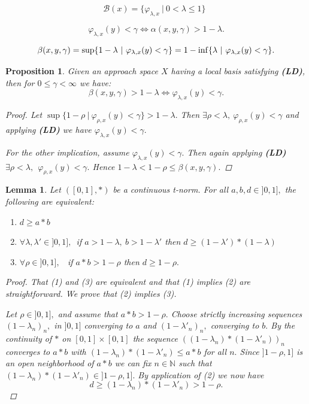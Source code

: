 \documentclass[10pt,a4paper]{amsart}
\newtheorem{proposition}{Proposition}
\newtheorem{lemma}{Lemma}
\newcommand{\N}{\ensuremath{\mathbb{N}}}
\renewcommand{\a}{\ensuremath{\alpha}}
\renewcommand{\b}{\ensuremath{\beta}}
\newcommand{\bbb}{\ensuremath{\mathcal{B}}}
\renewcommand{\inf}{\myinf}
\renewcommand{\l}{\ensuremath{\lambda}}
\DeclareMathOperator*{\myinf}{in\vphantom{p}f}
\begin{document}
\begin{equation}\label{associated}
\bbb(x) = \{ \varphi_{\l,x} \ | \ 0 < \l \leq 1 \} \ \ 
\end{equation}

\begin{equation}\label{equivlocal}
\varphi_{\l,x} (y) < \gamma \Leftrightarrow \a(x,y,\gamma) > 1-\l.
\end{equation}

\begin{equation}\label{beta}
\b(x,y,\gamma) = \sup \{1 - \l \ | \ \varphi_{\l,x} (y) < \gamma\} = 1 - \inf  \{\l \ | \ \varphi_{\l,x} (y) < \gamma\}.
\end{equation}

\begin{proposition}\label{equivbeta}
Given an approach space $X$ having a local basis satisfying {\bf(LD)},
then for $0 \leq \gamma < \infty$ we have:
$$
\b(x,y,\gamma) > 1 - \l   \Leftrightarrow  \varphi_{\l,x} (y) < \gamma.
$$
\begin{proof}
Let  $\sup \{1 - \rho \ | \ \varphi_{\rho,x} (y) < \gamma\}  > 1 - \l.$ Then $\exists \rho < \l, \ \varphi_{\rho,x}(y) < \gamma$ and applying {\bf(LD)} we have 
$\varphi_{\l,x}(y) < \gamma.$

For the other implication,  assume $\varphi_{\l,x}(y) < \gamma.$ Then again applying {\bf(LD)}\\
 $\exists \rho < \l, 
 \  \ \varphi_{\rho,x}(y) < \gamma.$
Hence $1 - \l < 1 - \rho \leq \b(x,y,\gamma).$
\end{proof}
\end{proposition}

\begin{lemma}\label{star}
Let $([0,1], *)$ be a continuous t-norm. For all $a,b,d \in ]0,1],$ the following are equivalent:
\begin{enumerate}
\item $d \geq a * b$
\item $\forall \l,\l' \in ]0,1], $\  if $a > 1-\l, \ b > 1-\l'$ then $d \geq (1-\l') * (1-\l)$
\item $\forall \rho  \in ]0,1],$ \ if $a * b > 1-\rho$ then $d \geq 1-\rho.$
\end{enumerate}
\begin{proof}
That (1) and (3) are equivalent and that (1) implies (2) are straightforward.
We prove that (2) implies (3). 

Let $ \rho  \in ]0,1],$ and assume that $a*b > 1-\rho.$
Choose strictly increasing sequences $(1-\l_n)_n,$ in $]0,1]$ converging to $a$ and $(1-\l'_n)_n,$ converging to $b.$ 
By the continuity of $*$ on $[0,1]\times [0,1]$ the sequence $((1-\l_n) * (1-\l'_n))_n$ converges to $a * b$ with $(1-\l_n) * (1-\l'_n) \leq a*b$ for all $n.$
Since $]1-\rho, 1]$ is an open neighborhood of $a * b$ we can fix $n \in \N$ such that $(1-\l_n) * (1-\l'_n) \in ]1-\rho, 1].$
By application of (2) we now have
$$
d \geq (1-\l_n) * (1-\l'_n) > 1 - \rho.
$$

\end{proof}
\end{lemma}
\end{document}
